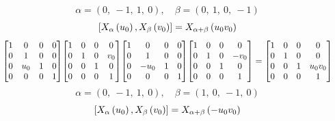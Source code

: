\documentclass[11pt]{article}
\theoremstyle{definition}
\begin{document}
\[
\alpha = \left( 0, \  -1, \  1, \  0\right), \quad \beta = \left( 0, \  1, \  0, \  -1\right)
\]
\[
\scaletoalign{\textwidth}{\left[ X_{\alpha}\left(u_{0}\right), X_{\beta}\left(v_{0}\right) \right] = X_{\alpha + \beta}\left(u_{0} v_{0}\right)}
\]
\[
\scaletoalign{\textwidth}{{\left[\begin{matrix}1 & 0 & 0 & 0\\0 & 1 & 0 & 0\\0 & u_{0} & 1 & 0\\0 & 0 & 0 & 1\end{matrix}\right]} {\left[\begin{matrix}1 & 0 & 0 & 0\\0 & 1 & 0 & v_{0}\\0 & 0 & 1 & 0\\0 & 0 & 0 & 1\end{matrix}\right]} {\left[\begin{matrix}1 & 0 & 0 & 0\\0 & 1 & 0 & 0\\0 & - u_{0} & 1 & 0\\0 & 0 & 0 & 1\end{matrix}\right]} {\left[\begin{matrix}1 & 0 & 0 & 0\\0 & 1 & 0 & - v_{0}\\0 & 0 & 1 & 0\\0 & 0 & 0 & 1\end{matrix}\right]} = {\left[\begin{matrix}1 & 0 & 0 & 0\\0 & 1 & 0 & 0\\0 & 0 & 1 & u_{0} v_{0}\\0 & 0 & 0 & 1\end{matrix}\right]}}
\]
\[
\alpha = \left( 0, \  -1, \  1, \  0\right), \quad \beta = \left( 1, \  0, \  -1, \  0\right)
\]
\[
\scaletoalign{\textwidth}{\left[ X_{\alpha}\left(u_{0}\right), X_{\beta}\left(v_{0}\right) \right] = X_{\alpha + \beta}\left(- u_{0} v_{0}\right)}
\]
\end{document}
